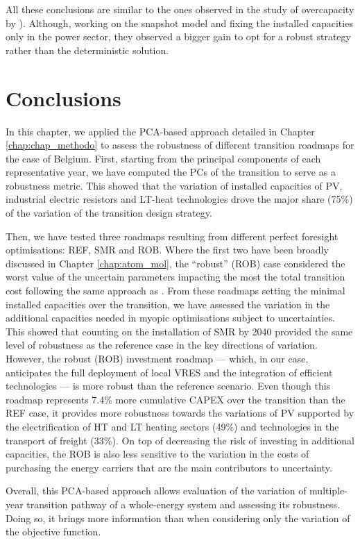 All these conclusions are similar to the ones observed in the study of overcapacity by \citet{moret2020overcapacity}). Although, working on the snapshot model and fixing the installed capacities only in the power sector, they observed a bigger gain to opt for a robust strategy rather than the deterministic solution.

\section{Conclusions}
\label{sec:RobPol:Conclusions}
In this chapter, we applied the \gls{PCA}-based approach detailed in Chapter \ref{chap:chap_methodo} to assess the robustness of different transition roadmaps for the case of Belgium. First, starting from the principal components of each representative year, we have computed the PCs of the transition to serve as a robustness metric. This showed that the variation of installed capacities of \gls{PV}, industrial electric resistors and \gls{LT}-heat technologies drove the major share (75\%) of the variation of the transition design strategy.  

Then, we have tested three roadmaps resulting from different perfect foresight optimisations: REF, SMR and ROB. Where the first two have been broadly discussed in Chapter \ref{chap:atom_mol}, the ``robust'' (ROB) case considered the worst value of the uncertain parameters impacting the most the total transition cost following the same approach as \citet{Moret2017PhDThesis}. From these roadmaps setting the minimal installed capacities over the transition, we have assessed the variation in the additional capacities needed in myopic optimisations subject to uncertainties. This showed that counting on the installation of \gls{SMR} by 2040 provided the same level of robustness as the reference case in the key directions of variation. However, the robust (ROB) investment roadmap --- which, in our case, anticipates the full deployment of local \gls{VRES} and the integration of efficient technologies --- is more robust than the reference scenario. Even though this roadmap represents 7.4\% more cumulative \gls{CAPEX} over the transition than the REF case, it provides more robustness towards the variations of \gls{PV} supported by the electrification of \gls{HT} and \gls{LT} heating sectors (49\%) and technologies in the transport of freight (33\%).  On top of decreasing the risk of investing in additional capacities, the ROB is also less sensitive to the variation in the costs of purchasing the energy carriers that are the main contributors to uncertainty.

Overall, this \gls{PCA}-based approach allows evaluation of the variation of multiple-year transition pathway of a whole-energy system and assessing its robustness. Doing so, it brings more information than when considering only the variation of the objective function.


